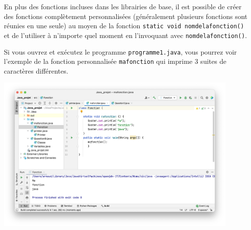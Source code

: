 En plus des fonctions incluses dans les librairies de base, il est possible de créer des fonctions complètement personnalisées (généralement plusieurs fonctions sont réunies en une seule) au moyen de la fonction \lstinline{static void nomdelafonction() } et de l'utiliser à n'importe quel moment en l'invoquant avec \lstinline{nomdelafonction()}.

Si vous ouvrez et exécutez le programme \lstinline{programme1.java}, vous pourrez voir l'exemple de la fonction personnalisée \lstinline{mafonction} qui imprime 3 suites de caractères différentes.

\begin{center}
\includegraphics[width=12cm]{10j}		
\end{center}



